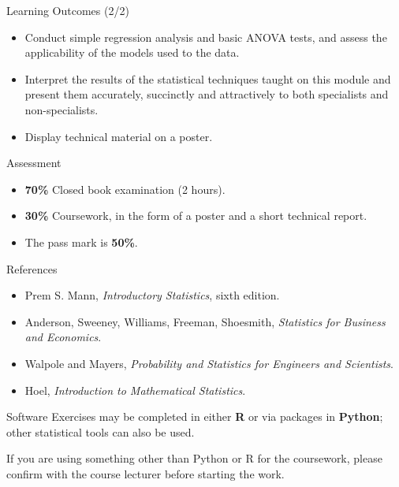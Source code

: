 \documentclass[10pt,aspectratio=169]{beamer}
\begin{document}
\begin{frame}{Learning Outcomes (2/2)}
  \begin{itemize}
    \item Conduct simple regression analysis and basic ANOVA tests, and assess
          the applicability of the models used to the data.
    \item Interpret the results of the statistical techniques taught on this
          module and present them accurately, succinctly and attractively to
          both specialists and non-specialists.
    \item Display technical material on a poster.
  \end{itemize}
\end{frame}

\begin{frame}{Assessment}
  \begin{itemize}
    \item \textbf{70\%} Closed book examination (2 hours).
    \item \textbf{30\%} Coursework, in the form of a poster and a short
          technical report.
    \item The pass mark is \textbf{50\%}.
  \end{itemize}
\end{frame}

\begin{frame}{References}
  \begin{itemize}
    \item Prem S. Mann, \emph{Introductory Statistics}, sixth edition.
    \item Anderson, Sweeney, Williams, Freeman, Shoesmith,
          \emph{Statistics for Business and Economics}.
    \item Walpole and Mayers,
          \emph{Probability and Statistics for Engineers and Scientists}.
    \item Hoel, \emph{Introduction to Mathematical Statistics}.
  \end{itemize}
\end{frame}

\begin{frame}{Software}
  Exercises may be completed in either \textbf{R} or via packages in
  \textbf{Python}; other statistical tools can also be used.

  \vspace{1em}
  If you are using something other than Python or R for the coursework, please
  confirm with the course lecturer before starting the work.
\end{frame}
\end{document}
